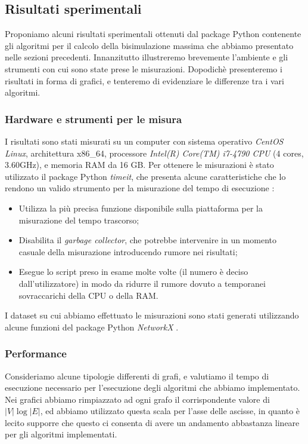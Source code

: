 \subsection{Risultati sperimentali}
Proponiamo alcuni risultati sperimentali ottenuti dal package Python contenente gli algoritmi per il calcolo della bisimulazione massima che abbiamo presentato nelle sezioni precedenti. Innanzitutto illustreremo brevemente l'ambiente e gli strumenti con cui sono state prese le misurazioni. Dopodichè presenteremo i risultati in forma di grafici, e tenteremo di evidenziare le differenze tra i vari algoritmi.

\subsubsection{Hardware e strumenti per le misura}
I risultati sono stati misurati su un computer con sistema operativo \emph{CentOS Linux}, architettura x86\_64, processore \emph{Intel(R) Core(TM) i7-4790 CPU} (4 cores, 3.60GHz), e memoria RAM da 16 GB. Per ottenere le misurazioni è stato utilizzato il package Python \emph{timeit}, che presenta alcune caratteristiche che lo rendono un valido strumento per la misurazione del tempo di esecuzione \cite{pythondocs}:
\begin{itemize}
    \item Utilizza la più precisa funzione disponibile sulla piattaforma per la misurazione del tempo trascorso;
    \item Disabilita il \emph{garbage collector}, che potrebbe intervenire in un momento casuale della misurazione introducendo rumore nei risultati;
    \item Esegue lo script preso in esame molte volte (il numero è deciso dall'utilizzatore) in modo da ridurre il rumore dovuto a temporanei sovraccarichi della CPU o della RAM.
\end{itemize}

I dataset su cui abbiamo effettuato le misurazioni sono stati generati utilizzando alcune funzioni del package Python \emph{NetworkX} \cite{networkx}.

\subsubsection{Performance}
Consideriamo alcune tipologie differenti di grafi, e valutiamo il tempo di esecuzione necessario per l'esecuzione degli algoritmi che abbiamo implementato. Nei grafici abbiamo rimpiazzato ad ogni grafo il corrispondente valore di $|V| \log |E|$, ed abbiamo utilizzato questa scala per l'asse delle ascisse, in quanto è lecito supporre che questo ci consenta di avere un andamento abbastanza lineare per gli algoritmi implementati.

